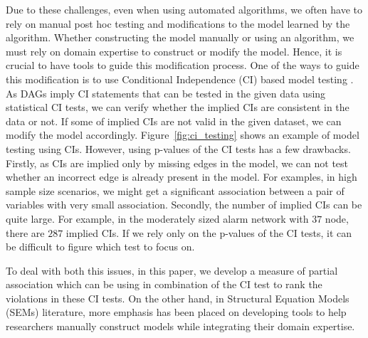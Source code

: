 \documentclass[letterpaper]{article} %
\begin{document}
Due to these challenges, even when using automated algorithms, we often have to
rely on manual post hoc testing and modifications to the model learned by the
algorithm. Whether constructing the model manually or using an algorithm, we
must rely on domain expertise to construct or modify the model. Hence, it is
crucial to have tools to guide this modification process. One of the ways to
guide this modification is to use Conditional Independence (CI) based model
testing \cite{Ankan2023}. As DAGs imply CI statements that can be tested in the
given data using statistical CI tests, we can verify whether the implied CIs
are consistent in the data or not. If some of implied CIs are not valid in the
given dataset, we can modify the model accordingly. Figure~\ref{fig:ci_testing}
shows an example of model testing using CIs. However, using p-values of the CI
tests has a few drawbacks. Firstly, as CIs are implied only by missing edges in
the model, we can not test whether an incorrect edge is already present in the
model. For examples, in high sample size scenarios, we might get a significant
association between a pair of variables with very small association. Secondly,
the number of implied CIs can be quite large. For example, in the moderately
sized alarm network with $ 37 $ node, there are $287$ implied CIs. If we rely
only on the p-values of the CI tests, it can be difficult to figure which test
to focus on.

To deal with both this issues, in this paper, we develop a measure of partial
association which can be using in combination of the CI test to rank the
violations in these CI tests. On the other hand, in Structural Equation Models
(SEMs) literature, more emphasis has been placed on developing tools to help
researchers manually construct models while integrating their domain expertise.
\end{document}
